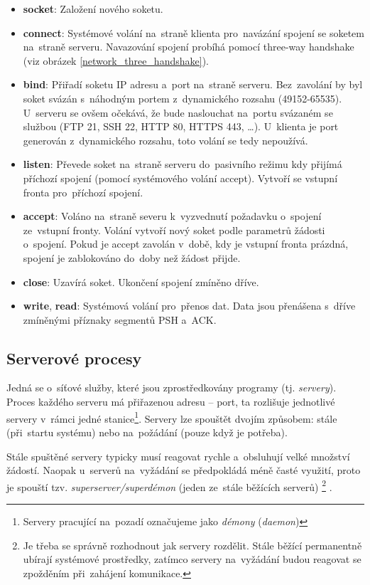 \begin{itemize}[noitemsep]
\item \textbf{socket}: Založení nového soketu.
\item \textbf{connect}: Systémové volání na~straně klienta pro~navázání spojení se soketem na~straně serveru. Navazování spojení probíhá pomocí three-way handshake (viz obrázek \ref{network_three_handshake}).
\item \textbf{bind}: Přiřadí soketu IP adresu a~port na~straně serveru. Bez~zavolání by byl soket svázán s~náhodným portem z~dynamického rozsahu (49152-65535). U~serveru se ovšem očekává, že bude naslouchat na~portu svázaném se službou (FTP 21, SSH 22, HTTP 80, HTTPS 443, \dots). U~klienta je port generován z~dynamického rozsahu, toto volání se tedy nepoužívá.
\item \textbf{listen}: Převede soket na~straně serveru do~pasivního režimu kdy přijímá příchozí spojení (pomocí systémového volání accept). Vytvoří se vstupní fronta pro~příchozí spojení.
\item \textbf{accept}: Voláno na~straně severu k~vyzvednutí požadavku o~spojení ze~vstupní fronty. Volání vytvoří nový soket podle parametrů žádosti o~spojení. Pokud je accept zavolán v~době, kdy je vstupní fronta prázdná, spojení je zablokováno do~doby než žádost přijde.
\item \textbf{close}: Uzavírá soket. Ukončení spojení zmíněno dříve.
\item \textbf{write}, \textbf{read}: Systémová volání pro~přenos dat. Data jsou přenášena s~dříve zmíněnými příznaky segmentů PSH a~ACK.
\end{itemize}

\subsection{Serverové procesy}

Jedná se o~síťové služby, které jsou zprostředkovány programy (tj. \emph{servery}). Proces každého serveru má přiřazenou adresu -- port, ta rozlišuje jednotlivé servery v~rámci jedné stanice\footnote{Servery pracující na~pozadí označujeme jako \emph{démony} (\emph{daemon})}. Servery lze spouštět dvojím způsobem: stále (při~startu systému) nebo na~požádání (pouze když je potřeba).

Stále spuštěné servery typicky musí reagovat rychle a~obsluhují velké množství žádostí. Naopak u~serverů na~vyžádání se předpokládá méně časté využití, proto je spouští tzv. \emph{superserver/superdémon} (jeden ze~stále běžících serverů)%
\footnote{Je třeba se správně rozhodnout jak servery rozdělit. Stále běžící permanentně ubírají systémové prostředky, zatímco servery na~vyžádání budou reagovat se zpožděním při~zahájení komunikace.}%
.

